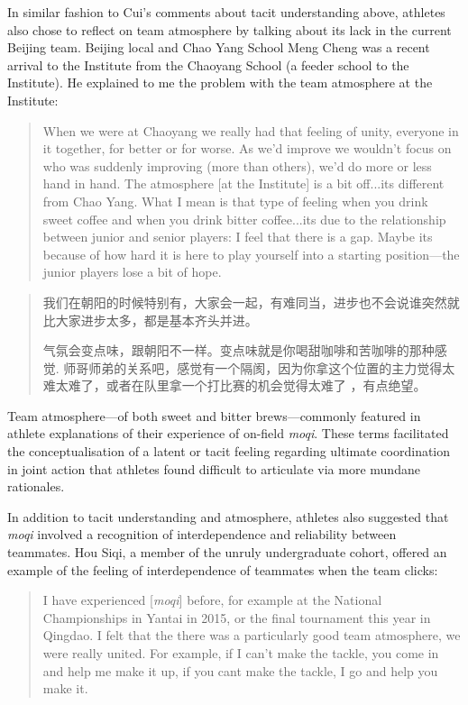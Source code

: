 \begin{CJK}{UTF8}{gbsn}
In similar fashion to Cui's comments about tacit understanding above, athletes also chose to reflect on team atmosphere by talking about its lack in the current Beijing team.  Beijing local and Chao Yang School Meng Cheng was a recent arrival to the Institute from the Chaoyang School (a feeder school to the Institute).  He explained to me the problem with the team atmosphere at the Institute:

    \begin{quote}
      When we were at Chaoyang we really had that feeling of unity, everyone in it together, for better or for worse.  As we'd improve we wouldn't focus on who was suddenly improving (more than others), we'd do more or less hand in hand.  The atmosphere [at the Institute] is a bit off...its different from Chao Yang.  What I mean is that type of feeling when you drink sweet coffee and when you drink bitter coffee...its due to the relationship between junior and senior players: I feel that there is a gap.  Maybe its because of how hard it is here to play yourself into a starting position---the junior players lose a bit of hope.
    \end{quote}

    \begin{quote}
      我们在朝阳的时候特别有，大家会一起，有难同当，进步也不会说谁突然就比大家进步太多，都是基本齐头并进。

      气氛会变点味，跟朝阳不一样。变点味就是你喝甜咖啡和苦咖啡的那种感觉. 师哥师弟的关系吧，感觉有一个隔阂，因为你拿这个位置的主力觉得太难太难了，或者在队里拿一个打比赛的机会觉得太难了 ，有点绝望。
    \end{quote}

Team atmosphere---of both sweet and bitter brews---commonly featured in athlete explanations of their experience of on-field \textit{moqi}.  These terms facilitated the conceptualisation of a latent or tacit feeling regarding ultimate coordination in joint action that athletes found difficult to articulate via more mundane rationales.

In addition to tacit understanding and atmosphere, athletes also suggested that \textit{moqi} involved a recognition of interdependence and reliability between teammates.  Hou Siqi, a member of the unruly undergraduate cohort, offered an example of the feeling of interdependence of teammates when the team clicks:

  \begin{quote}
    I have experienced [\textit{moqi}] before, for example at the National Championships in Yantai in 2015, or the final tournament this year in Qingdao.  I felt that the there was a particularly good team atmosphere, we were really united.  For example, if I can't make the tackle, you come in and help me make it up, if you cant make the tackle, I go and help you make it.
  \end{quote}


\end{CJK}
